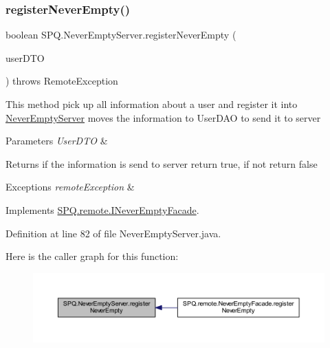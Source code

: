 \subsubsection{\texorpdfstring{register\+Never\+Empty()}{registerNeverEmpty()}}
{\footnotesize\ttfamily boolean S\+P\+Q.\+Never\+Empty\+Server.\+register\+Never\+Empty (\begin{DoxyParamCaption}\item[{\mbox{\hyperlink{class_s_p_q_1_1dto_1_1_user_d_t_o}{User\+D\+TO}}}]{user\+D\+TO }\end{DoxyParamCaption}) throws Remote\+Exception}

This method pick up all information about a user and register it into \mbox{\hyperlink{class_s_p_q_1_1_never_empty_server}{Never\+Empty\+Server}} moves the information to User\+D\+AO to send it to server 
\begin{DoxyParams}{Parameters}
{\em User\+D\+TO} & \\
\hline
\end{DoxyParams}
\begin{DoxyReturn}{Returns}
if the information is send to server return true, if not return false 
\end{DoxyReturn}

\begin{DoxyExceptions}{Exceptions}
{\em remote\+Exception} & \\
\hline
\end{DoxyExceptions}


Implements \mbox{\hyperlink{interface_s_p_q_1_1remote_1_1_i_never_empty_facade_a7867e1e698fea32a535a1daeda4e8d6a}{S\+P\+Q.\+remote.\+I\+Never\+Empty\+Facade}}.



Definition at line 82 of file Never\+Empty\+Server.\+java.

Here is the caller graph for this function\+:\nopagebreak
\begin{figure}[H]
\begin{center}
\leavevmode
\includegraphics[width=350pt]{class_s_p_q_1_1_never_empty_server_ae52815c925e04018d6a1b2742d605063_icgraph}
\end{center}
\end{figure}
\mbox{\label{class_s_p_q_1_1_never_empty_server_ad39f95ea2309841407f7e8b9e1b9f664}} 
